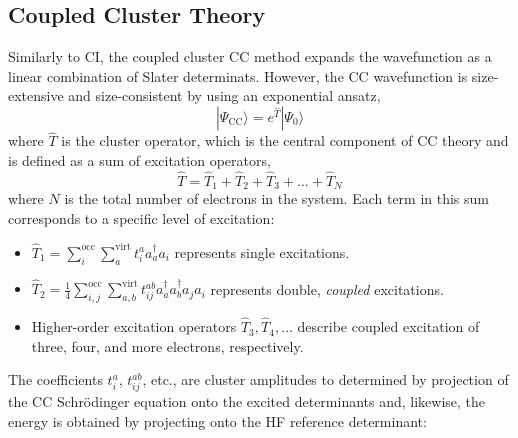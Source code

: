 \subsection{Coupled Cluster Theory} \label{sec:CCTheory}
Similarly to CI, the coupled cluster CC method expands the wavefunction as a linear combination of Slater determinats. However, the CC wavefunction is size-extensive and size-consistent by using an exponential ansatz,
\begin{equation}\label{eq:CCWavenfunc}
    | \Psi_{\mathrm{CC}} \rangle = e^{\hat{T}} | \Psi_{0} \rangle
\end{equation}
where $\hat{T}$ is the cluster operator, which is the central component of CC theory and is defined as a sum of excitation operators,
\begin{equation}
    \hat{T} = \hat{T}_1 + \hat{T}_2 + \hat{T}_3 + \dots + \hat{T}_N
\end{equation}
where $N$ is the total number of electrons in the system. Each term in this sum corresponds to a specific level of excitation:
\begin{itemize}
    \item $\hat{T}_1 = \sum_{i}^{\text{occ}} \sum_{a}^{\text{virt}} t_i^a a_a^{\dagger} a_i$ represents single excitations.
    \item $\hat{T}_2 = \frac{1}{4} \sum_{i,j}^{\text{occ}} \sum_{a,b}^{\text{virt}} t_{ij}^{ab} a_a^{\dagger} a_b^{\dagger} a_j a_i$ represents double, \textit{coupled} excitations.
    \item Higher-order excitation operators $\hat{T}_3, \hat{T}_4, \dots$ describe coupled excitation of three, four, and more electrons, respectively.
\end{itemize}
The coefficients $t_i^a$, $t_{ij}^{ab}$, etc., are cluster amplitudes to determined by projection of the CC Schr\"{o}dinger equation onto the excited determinants and, likewise, the energy is obtained by projecting onto the HF reference determinant:
\iffalse One of the most significant advantages of coupled cluster theory is its property of size consistency. A size-consistent method correctly describes the energy of a system composed of multiple non-interacting subsystems as the sum of the energies of the individual subsystems. The exponential form, when expanded as a Taylor series,
\begin{equation}
    e^{\hat{T}} = 1 + \hat{T} + \frac{1}{2!} \hat{T}^2 + \dots
\end{equation}
inherently includes terms that represent disconnected clusters, which are essential for size consistency. \fi
